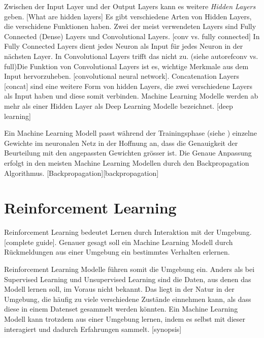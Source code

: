 
Zwischen der Input Layer und der Output Layers kann es weitere \emph{Hidden
Layers} geben. [What are hidden layers] Es gibt verschiedene Arten von Hidden
Layers, die verschidene Funktionen haben. Zwei der meist verwendeten Layers sind
Fully Connected (Dense) Layers und Convolutional Layers. [conv vs. fully
connected] In Fully Connected Layers dient jedes Neuron als Input für jedes
Neuron in der nächsten Layer. In Convolutional Layers trifft das nicht zu.
(siehe autoref{conv vs. full})Die Funktion von Convolutional Layers ist es,
wichtige Merkmale aus dem Input hervorzuheben. [convolutional neural network].
Concatenation Layers [concat] sind eine weitere Form von hidden Layers, die zwei
verschiedene Layers als Input haben und diese somit verbinden. Machine Learning
Modelle werden ab mehr als einer Hidden Layer als Deep Learning Modelle
bezeichnet. [deep learning]


Ein Machine Learning Modell passt während der Trainingsphase (siehe
) einzelne Gewichte im neuronalen Netz in der
Hoffnung an, dass die Genauigkeit der Beurteilung mit den angepassten Gewichten
grösser ist. Die Genaue Anpassung erfolgt in den meisten Machine Learning
Modellen durch den Backpropagation Algorithmus. [Backpropagation][backpropagation]

\section{Reinforcement Learning}
\label{chap:t_rl}
Reinforcement Learning bedeutet Lernen durch Interaktion mit der Umgebung.
[complete guide]. Genauer gesagt soll ein Machine Learning Modell durch
Rückmeldungen aus einer Umgebung ein bestimmtes Verhalten erlernen.

Reinforcement Learning Modelle führen somit die Umgebung ein. Anders als bei
Supervised Learning und Unsupervised Learning sind die Daten, aus denen das
Modell lernen soll, im Voraus nicht bekannt. Das liegt in der Natur in der
Umgebung, die häufig zu viele verschiedene Zustände einnehmen kann, als dass
diese in einem Datenset gesammelt werden könnten. Ein Machine Learning Modell
kann trotzdem aus einer Umgebung lernen, indem es selbst mit dieser interagiert
und dadurch Erfahrungen sammelt. [synopsis]

